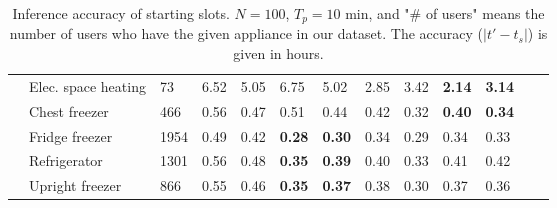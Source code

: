 \documentclass[11pt,a4paper]{article}
\theoremstyle{plain}
\theoremstyle{plain}
\theoremstyle{plain}
\theoremstyle{plain}
\theoremstyle{nonumberplain} \theoremseparator{}
\begin{document}
\begin{table*}
\begin{tabular}{|c|l|l|l|l|l|l|l|l|l|l|l|l|}
  \cline{2-11}

&  Elec. space heating  & 73 & 6.52 & 5.05 & 6.75 & 5.02 & 2.85 & 3.42 & \textbf{2.14} & \textbf{3.14}\\ 
  \cline{2-11}

&   Chest freezer  & 466 & 0.56 & 0.47 & 0.51 & 0.44 & 0.42 & 0.32 & \textbf{0.40} & \textbf{0.34}\\
  \cline{2-11}

&  Fridge freezer  & 1954 & 0.49 & 0.42 & \textbf{0.28} & \textbf{0.30} & 0.34 & 0.29 & 0.34 & 0.33\\ 

  \cline{2-11}

&  Refrigerator  & 1301 & 0.56 & 0.48 & \textbf{0.35}& \textbf{0.39} & 0.40 & 0.33 & 0.41 & 0.42\\ 
  \cline{2-11}

&  Upright freezer  & 866 & 0.55 & 0.46 & \textbf{0.35} & \textbf{0.37} & 0.38 & 0.30 & 0.37 & 0.36\\ 
 \hline
\hline

\end{tabular}
\caption{Inference accuracy of starting slots. $N=100$, $T_p=10$ min, and "\# of users" means the number of users who 
have the given appliance in our dataset. The accuracy ($|t'-t_s|$) is given in hours.}
\label{tab:devices2}
\end{table*}
\end{document}
